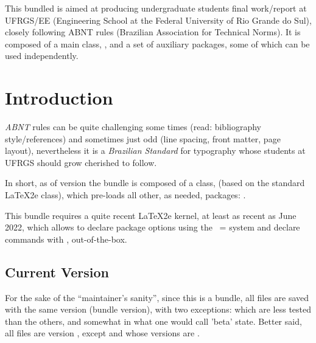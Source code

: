 \documentclass[article,nogeometry,english,tocdepth=3,secdepth=3]{ufrgscca} %
\newif\iffulldoc
\begin{document}
\iffulldoc
\tstitle{
  author={Alceu Frigeri\footnote{\tsverb{https://github.com/alceu-frigeri/ufrgscca}}},
  date={\monthname\space\number\year},
  title={The ufrgscca, and associated, Packages\\ Version \ufrgsccaversion \\(extended documentation)}
  }
\else
{}
\fi

	\begin{tsabstract}
		This bundled is aimed at producing undergraduate students final work/report at UFRGS/EE (Engineering School at the Federal University of Rio Grande do Sul), closely following ABNT rules (Brazilian Association for Technical Norms). It is composed of a main class, , and a set of auxiliary packages, some of which can be used independently.

	\end{tsabstract}

\tableofcontents

	\section{Introduction}
	\emph{ABNT} rules can be quite challenging some times (read: bibliography style/references) and sometimes just odd (line spacing, front matter, page layout), nevertheless it is a \emph{Brazilian Standard} for typography whose students at UFRGS should grow cherished to follow.

	In short, as of version \ufrgsccaversion\space the bundle is composed of a class,  (based on the standard \LaTeX2e  class), which pre-loads all other, as needed, packages: .

\begin{tsremark}[N.B.:]
	This bundle requires a quite recent \LaTeX2e kernel, at least as recent as June 2022, which allows to declare package options using the ~= system and declare commands with \tsmacro{\NewDocumentCommand}{}, out-of-the-box.
\end{tsremark}

\subsection{Current Version}
For the sake of the “maintainer's sanity”, since this is a bundle, all files are saved with the same version (bundle version), with two exceptions:   which are less tested than the others, and somewhat in what one would call 'beta' state. Better said, all files are version \ufrgsccaversion, except  and  whose versions are \ufrgsccacurrversion.
\end{document}
